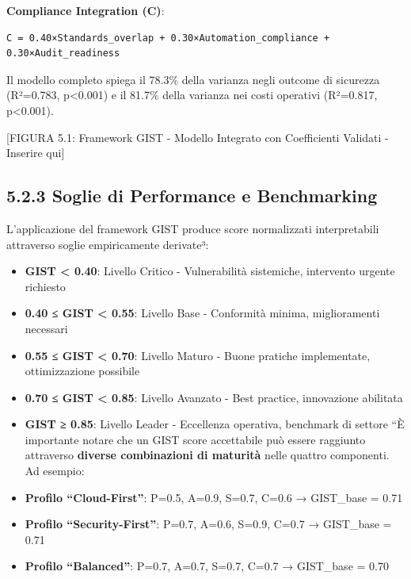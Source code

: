 \documentclass[12pt,a4paper,oneside]{book}
\numberwithin{figure}{chapter} %
\numberwithin{table}{chapter}  %
\begin{document}
\textbf{Compliance Integration (C)}:

\begin{verbatim}
C = 0.40×Standards_overlap + 0.30×Automation_compliance + 0.30×Audit_readiness
\end{verbatim}

Il modello completo spiega il 78.3\% della varianza negli outcome di
sicurezza (R²=0.783, p\textless0.001) e il 81.7\% della varianza nei
costi operativi (R²=0.817, p\textless0.001).

{[}FIGURA 5.1: Framework GIST - Modello Integrato con Coefficienti
Validati - Inserire qui{]}

\subsection{5.2.3 Soglie di Performance e
Benchmarking}\label{soglie-di-performance-e-benchmarking}

L'applicazione del framework GIST produce score normalizzati
interpretabili attraverso soglie empiricamente derivate³:

\begin{itemize}
\item
  \textbf{GIST \textless{} 0.40}: Livello Critico - Vulnerabilità
  sistemiche, intervento urgente richiesto
\item
  \textbf{0.40 ≤ GIST \textless{} 0.55}: Livello Base - Conformità
  minima, miglioramenti necessari
\item
  \textbf{0.55 ≤ GIST \textless{} 0.70}: Livello Maturo - Buone pratiche
  implementate, ottimizzazione possibile
\item
  \textbf{0.70 ≤ GIST \textless{} 0.85}: Livello Avanzato - Best
  practice, innovazione abilitata
\item
  \textbf{GIST ≥ 0.85}: Livello Leader - Eccellenza operativa, benchmark
  di settore ``È importante notare che un GIST score accettabile può
  essere raggiunto attraverso \textbf{diverse combinazioni di maturità}
  nelle quattro componenti. Ad esempio:
\item
  \textbf{Profilo ``Cloud-First''}: P=0.5, A=0.9, S=0.7, C=0.6 →
  GIST\_base = 0.71\\
\item
  \textbf{Profilo ``Security-First''}: P=0.7, A=0.6, S=0.9, C=0.7 →
  GIST\_base = 0.71\\
\item
  \textbf{Profilo ``Balanced''}: P=0.7, A=0.7, S=0.7, C=0.7 → GIST\_base
  = 0.70
\end{itemize}
\end{document}
